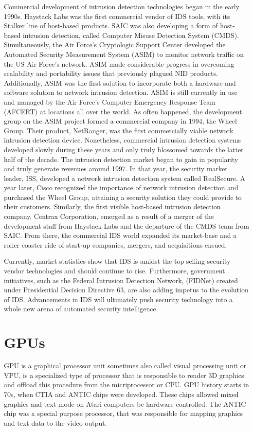 \documentclass[thesis=M,english]{FITthesis}[2011/07/15]
\begin{document}
Commercial development of intrusion detection technologies began in the early 1990s. Haystack Labs was the first commercial vendor of IDS tools, with its Stalker line of host-based products. SAIC was also developing a form of host-based intrusion detection, called Computer Misuse Detection System (CMDS). Simultaneously, the Air Force's Cryptologic Support Center developed the Automated Security Measurement System (ASIM) to monitor network traffic on the US Air Force's network. ASIM made considerable progress in overcoming scalability and portability issues that previously plagued NID products. Additionally, ASIM was the first solution to incorporate both a hardware and software solution to network intrusion detection. ASIM is still currently in use and managed by the Air Force's Computer Emergency Response Team (AFCERT) at locations all over the world. As often happened, the development group on the ASIM project formed a commercial company in 1994, the Wheel Group. Their product, NetRanger, was the first commercially viable network intrusion detection device. Nonetheless, commercial intrusion detection systems developed slowly during these years and only truly blossomed towards the latter half of the decade.
The intrusion detection market began to gain in popularity and truly generate revenues around 1997. In that year, the security market leader, ISS, developed a network intrusion detection system called RealSecure. A year later, Cisco recognized the importance of network intrusion detection and purchased the Wheel Group, attaining a security solution they could provide to their customers. Similarly, the first visible host-based intrusion detection company, Centrax Corporation, emerged as a result of a merger of the development staff from Haystack Labs and the departure of the CMDS team from SAIC. From there, the commercial IDS world expanded its market-base and a roller coaster ride of start-up companies, mergers, and acquisitions ensued.

Currently, market statistics show that IDS is amidst the top selling security vendor technologies and should continue to rise. Furthermore, government initiatives, such as the Federal Intrusion Detection Network, (FIDNet) created under Presidential Decision Directive 63, are also adding impetus to the evolution of IDS. Advancements in IDS will ultimately push security technology into a whole new arena of automated security intelligence.

\section{GPUs}
GPU is a graphical processor unit sometimes also called visual processing unit or VPU, is a specialized type of processor that is responsible to render 3D graphics and offload this procedure from the micriprocessor or CPU. GPU history starts in 70s, when CTIA and ANTIC chips were developed. These chips allowed mixed graphics and text mode on Atari computers be hardware controlled. The ANTIC chip was a special purpose processor, that was responsible for mapping graphics and text data to the video output.
\end{document}
